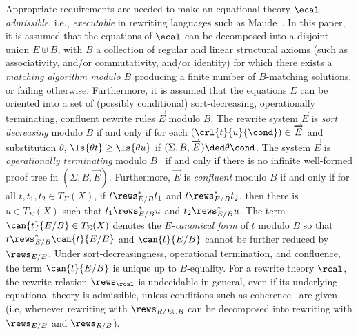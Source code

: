 Appropriate requirements are needed to make an equational theory
$\ecal$ {\em admissible}, i.e., {\em executable} in rewriting
languages such as Maude~\cite{clavel-maudebook-2007}.  In this paper,
it is assumed that the equations of $\ecal$ can be decomposed into a
disjoint union $E \uplus B$, with $B$ a collection of regular and
linear structural axioms (such as associativity, and/or commutativity,
and/or identity) for which there exists a {\em matching algorithm
  modulo $B$} producing a finite number of $B$-matching solutions, or
failing otherwise. Furthermore, it is assumed that the equations $E$
can be oriented into a set of (possibly conditional)
{sort-decreasing}, {operationally terminating}, {confluent} rewrite
rules $\overrightarrow{E}$ modulo $B$. The rewrite system
$\overrightarrow{E}$ is {\em sort decreasing} modulo $B$ if and only
if for each $(\crl{t}{u}{\cond}) \in \overrightarrow{E}$ and
substitution $\theta$, $\ls{\theta t} \geq \ls{\theta u}$ if
$(\Sigma,B,\overrightarrow{E}) \ded \theta\cond$.  The system
$\overrightarrow{E}$ is {\em operationally terminating} modulo
$B$~\cite{duran-operterm-2008} if and only if there is no infinite
well-formed proof tree in $(\Sigma,B,\overrightarrow{E})$.
Furthermore, $\overrightarrow{E}$ is {\em confluent} modulo $B$ if and
only if for all $t,t_1,t_2 \in T_\Sigma(X)$, if $t \rews^*_{E/B} t_1$
and $t \rews^*_{E/B} t_2$, then there is $u \in T_\Sigma(X)$ such that
$t_1 \rews^*_{E/B} u$ and $t_2 \rews^*_{E/B} u$.  The term
$\can{t}{E/B} \in T_\Sigma(X)$ denotes the {\em $E$-canonical form} of
$t$ modulo $B$ so that $t \rews_{E/B}^* \can{t}{E/B}$ and $\can{t}{E /
  B}$ cannot be further reduced by $\rews_{E/B}$. Under
sort-decreasingness, operational termination, and confluence, the term
$\can{t}{E/B}$ is unique up to $B$-equality.  For a rewrite theory
$\rcal$, the rewrite relation $\rews_\rcal$ is undecidable in general,
even if its underlying equational theory is admissible, unless
conditions such as coherence~\cite{viry-coherence-2002} are given
(i.e, whenever rewriting with $\rews_{R/E \cup B}$ can be decomposed
into rewriting with $\rews_{E/B}$ and $\rews_{R/B}$). 
